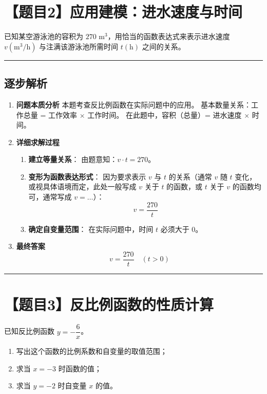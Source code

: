 \documentclass[UTF8]{ctexart}
\newenvironment{redenv}{\color{red}}{}
\newenvironment{detailedanalysis}{%
    \color{red}
    \begin{enumerate}[label=\textbf{第\arabic*步：}, leftmargin=*, align=left, itemsep=1.5ex]
}{%
    \end{enumerate}
}
\newcommand{\problemrule}{\noindent\rule{\textwidth}{1.5pt}\vspace{-0.8em}}
\newcommand{\analysisrule}{\noindent\rule{\textwidth}{0.8pt}\vspace{-0.8em}}
\begin{document}
\section*{【题目2】应用建模：进水速度与时间}
已知某空游泳池的容积为 $270 \text{ m}^3$，用恰当的函数表达式来表示进水速度 $v (\text{m}^3/\text{h})$ 与注满该游泳池所需时间 $t (\text{h})$ 之间的关系。

\begin{redenv}
\analysisrule
\subsection*{逐步解析}

\begin{detailedanalysis}
\item \textbf{问题本质分析}
本题考查反比例函数在实际问题中的应用。
基本数量关系：工作总量 = 工作效率 $\times$ 工作时间。
在此题中，容积（总量）= 进水速度 $\times$ 时间。

\item \textbf{详细求解过程}
\begin{enumerate}[label=\alph*.]
    \item \textbf{建立等量关系}：
    由题意知：$v \cdot t = 270$。
    \item \textbf{变形为函数表达形式}：
    因为要求表示 $v$ 与 $t$ 的关系（通常 $v$ 随 $t$ 变化，或视具体语境而定，此处一般写成 $v$ 关于 $t$ 的函数，或 $t$ 关于 $v$ 的函数均可，通常写成 $v = \dots$）：
    \[ v = \frac{270}{t} \]
    \item \textbf{确定自变量范围}：
    在实际问题中，时间 $t$ 必须大于 0。
\end{enumerate}

\item \textbf{最终答案}
\[ v = \frac{270}{t} \quad (t > 0) \]
\end{detailedanalysis}
\end{redenv}

\problemrule
\section*{【题目3】反比例函数的性质计算}
已知反比例函数 $y = -\dfrac{6}{x}$。
\begin{enumerate}[label=(\arabic*), itemsep=5pt]
    \item 写出这个函数的比例系数和自变量的取值范围；
    \item 求当 $x = -3$ 时函数的值；
    \item 求当 $y = -2$ 时自变量 $x$ 的值。
\end{enumerate}
\end{document}

